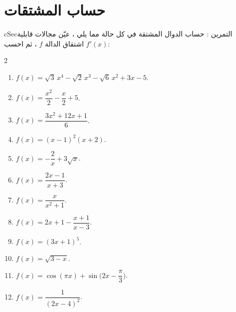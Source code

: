 \documentclass[12pt,a4paper]{article}
\newenvironment{BOX}[2]{\begin{otherlanguage}{english}\begin{arbox}{#1}{#2}}{\end{arbox}\end{otherlanguage}}
\newcounter{exo}
\newenvironment{tamrin}[1]{\stepcounter{exo}\begin{BOX}{cSec}{التمرين \theexo: #1}}{\end{BOX}}
\begin{document}
\section{حساب المشتقات}
\begin{tamrin}{حساب الدوال المشتقة}
في كل حالة مما يلي ، عيّن مجالات قابلية اشتقاق الدالة $f$ ، ثم احسب $f'(x)$:
\begin{multicols}{2}
\begin{enumerate}
\item $f(x)=\sqrt3\,x^4-\sqrt2\,x^3-\sqrt6\,x^2+3x-5$.
\item $f(x)=\dfrac{x^2}{2}-\dfrac x2+5$.
\item $f(x)=\dfrac{3x^2+12x+1}{6}$.
\item $f(x)=(x-1)^2(x+2)$.
\item $f(x)=-\dfrac2x+3\sqrt x$.
\item $f(x)=\dfrac{2x-1}{x+3}$.
\item $f(x)=\dfrac{x}{x^2+1}$.
\item $f(x)=2x+1-\dfrac{x+1}{x-3}$.
\item $f(x)=(3x+1)^5$.
\item $f(x)=\sqrt{3-x}$.
\item $f(x)=\cos(\pi x)+\sin\Big(2x-\dfrac\pi3\Big)$.
\item $f(x)=\dfrac{1}{(2x-4)^2}$.
\end{enumerate}
\end{multicols}
\end{tamrin}
\end{document}

